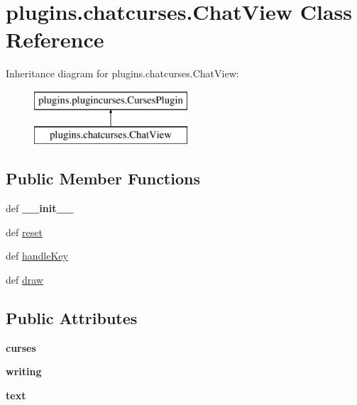 \hypertarget{classplugins_1_1chatcurses_1_1_chat_view}{\section{plugins.\-chatcurses.\-Chat\-View \-Class \-Reference}
\label{classplugins_1_1chatcurses_1_1_chat_view}
}
\-Inheritance diagram for plugins.\-chatcurses.\-Chat\-View\-:\begin{figure}[H]
\begin{center}
\leavevmode
\includegraphics[height=2.000000cm]{classplugins_1_1chatcurses_1_1_chat_view}
\end{center}
\end{figure}
\subsection*{\-Public \-Member \-Functions}
\begin{DoxyCompactItemize}
\item 
\hypertarget{classplugins_1_1chatcurses_1_1_chat_view_a24955bbd50c58d0dad24d710a564742e}{def {\bfseries \-\_\-\-\_\-init\-\_\-\-\_\-}}\label{classplugins_1_1chatcurses_1_1_chat_view_a24955bbd50c58d0dad24d710a564742e}

\item 
def \hyperlink{classplugins_1_1chatcurses_1_1_chat_view_abdccabe6bc73dacc4e01354b992f4cf6}{reset}
\item 
def \hyperlink{classplugins_1_1chatcurses_1_1_chat_view_a96c4c19690f0c756a121226ce681eb03}{handle\-Key}
\item 
def \hyperlink{classplugins_1_1chatcurses_1_1_chat_view_a7f542a8a2cf51ecabf42f5da627e36c3}{draw}
\end{DoxyCompactItemize}
\subsection*{\-Public \-Attributes}
\begin{DoxyCompactItemize}
\item 
\hypertarget{classplugins_1_1chatcurses_1_1_chat_view_af4b6464f13631f2ace71c8df8af327a5}{{\bfseries curses}}\label{classplugins_1_1chatcurses_1_1_chat_view_af4b6464f13631f2ace71c8df8af327a5}

\item 
\hypertarget{classplugins_1_1chatcurses_1_1_chat_view_a9c13ec017f5022a2679d474b7baef095}{{\bfseries writing}}\label{classplugins_1_1chatcurses_1_1_chat_view_a9c13ec017f5022a2679d474b7baef095}

\item 
\hypertarget{classplugins_1_1chatcurses_1_1_chat_view_aa60bbf0e97d3dc2834fe57944bd6a865}{{\bfseries text}}\label{classplugins_1_1chatcurses_1_1_chat_view_aa60bbf0e97d3dc2834fe57944bd6a865}

\end{DoxyCompactItemize}
